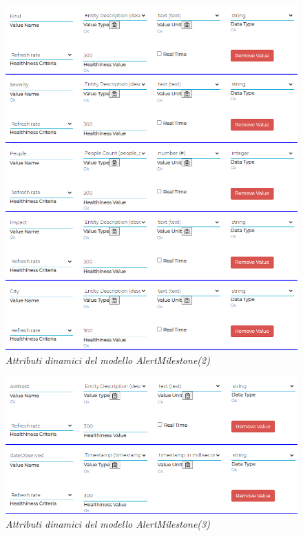 \documentclass[a4paper, openright, thesis]{report}
\begin{document}
\begin{figure}[H]
    \centering
    \includegraphics[width=1\linewidth]{img/AlertMilestone4.png}
    \caption{\textit{ Attributi dinamici del modello AlertMilestone(2)}}
    \label{11}
\end{figure}

\begin{figure}[H]
    \centering
    \includegraphics[width=1\linewidth]{img/AlertMilestone5.png}
    \caption{\textit{ Attributi dinamici del modello AlertMilestone(3)}}
    \label{12}
\end{figure}
\end{document}
